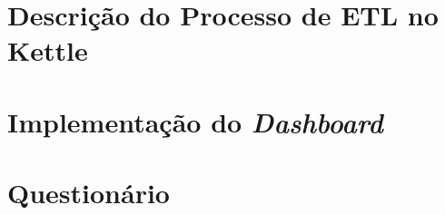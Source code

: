 \begin{apendicesenv}

\chapter{Descrição do Processo de ETL no Kettle}
\label{sec:implementação-etl}



\chapter{Implementação do \textit{Dashboard}}
\label{sec:implementação-dashboard}


\chapter{Questionário}
\label{sec:questionário}

\end{apendicesenv}

